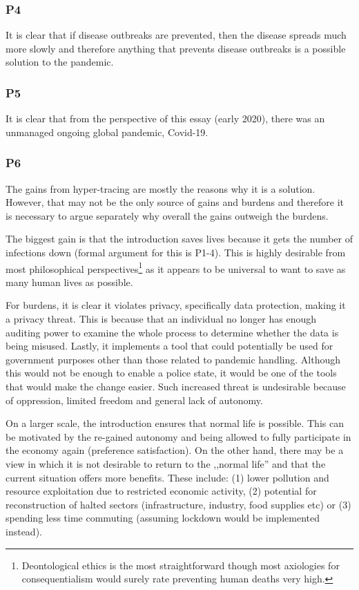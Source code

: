 \subsubsection*{P4}

It is clear that if disease outbreaks are prevented, then the disease spreads much more slowly and therefore anything that prevents disease outbreaks is a possible solution to the pandemic.

\subsubsection*{P5}

It is clear that from the perspective of this essay (early 2020), there was an unmanaged ongoing global pandemic, Covid-19.

\subsubsection*{P6}

The gains from hyper-tracing are mostly the reasons why it is a solution.
However, that may not be the only source of gains and burdens and therefore it is necessary to argue separately why overall the gains outweigh the burdens.

The biggest gain is that the introduction saves lives because it gets the number of infections down (formal argument for this is P1-4).
This is highly desirable from most philosophical perspectives\footnote{Deontological ethics is the most straightforward though most axiologies for consequentialism would surely rate preventing human deaths very high.} as it appears to be universal to want to save as many human lives as possible.

For burdens, it is clear it violates privacy, specifically data protection, making it a privacy threat.
This is because that an individual no longer has enough auditing power to examine the whole process to determine whether the data is being misused.
Lastly, it implements a tool that could potentially be used for government purposes other than those related to pandemic handling.
Although this would not be enough to enable a police state, it would be one of the tools that would make the change easier.
Such increased threat is undesirable because of oppression, limited freedom and general lack of autonomy.

On a larger scale, the introduction ensures that normal life is possible.
This can be motivated by the re-gained autonomy and being allowed to fully participate in the economy again (preference satisfaction).
On the other hand, there may be a view in which it is not desirable to return to the ,,normal life'' and that the current situation offers more benefits.
These include: (1) lower pollution and resource exploitation due to restricted economic activity, (2) potential for reconstruction of halted sectors (infrastructure, industry, food supplies etc) or (3) spending less time commuting (assuming lockdown would be implemented instead).

